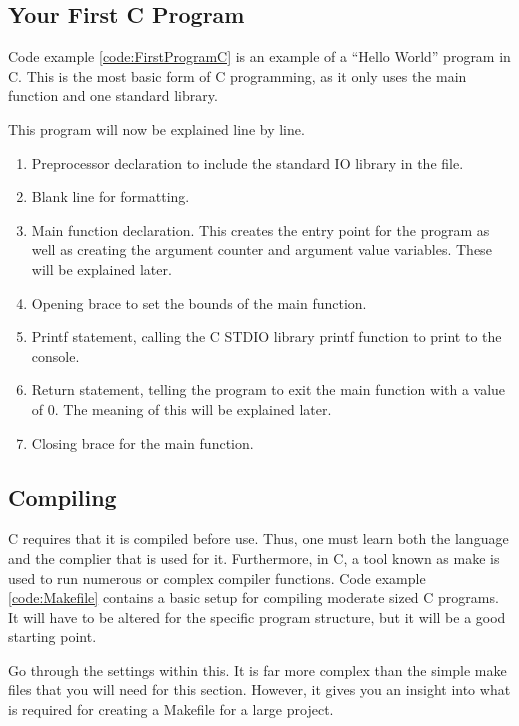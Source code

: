 \documentclass[a4paper,11pt]{report}
\begin{document}
		\subsection{Your First C Program}
			Code example \ref{code:FirstProgramC} is an example of a ``Hello World'' program in C. 
			This is the most basic form of C programming, as it only uses the main function and one standard library. 
			\begin{code}
				C}]{./first.c}
				\caption{A Simple Hello World Program in C}
				\label{code:FirstProgramC}
			\end{code}
			This program will now be explained line by line. 
			\begin{enumerate}
				\item Preprocessor declaration to include the standard IO library in the file. 
				\item Blank line for formatting. 
				\item Main function declaration. 
					This creates the entry point for the program as well as creating the argument counter and argument value variables. 
					These will be explained later. 
				\item Opening brace to set the bounds of the main function. 
				\item Printf statement, calling the C STDIO library printf function to print to the console. 
				\item Return statement, telling the program to exit the main function with a value of 0. 
					The meaning of this will be explained later. 
				\item Closing brace for the main function. 
			\end{enumerate}
		\subsection{Compiling}
			C requires that it is compiled before use. 
			Thus, one must learn both the language and the complier that is used for it. 
			Furthermore, in C, a tool known as make is used to run numerous or complex compiler functions. 
			Code example \ref{code:Makefile} contains a basic setup for compiling moderate sized C programs. 
			It will have to be altered for the specific program structure, but it will be a good starting point. 

			\begin{code}
				make}]{./make}
				\caption{A Basic Makefile}
				\label{code:Makefile}
			\end{code}
			Go through the settings within this. 
			It is far more complex than the simple make files that you will need for this section. 
			However, it gives you an insight into what is required for creating a Makefile for a large project.
			\FloatBarrier
\end{document}
